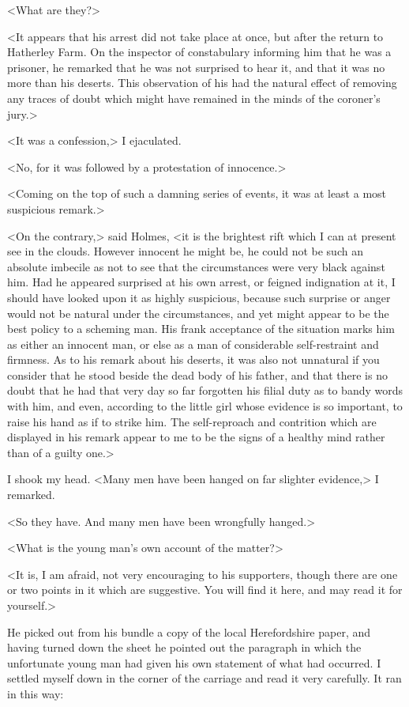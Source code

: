 <What are they?>

<It appears that his arrest did not take place at once, but after the return to Hatherley Farm. On the inspector of constabulary informing him that he was a prisoner, he remarked that he was not surprised to hear it, and that it was no more than his deserts. This observation of his had the natural effect of removing any traces of doubt which might have remained in the minds of the coroner's jury.>

<It was a confession,> I ejaculated.

<No, for it was followed by a protestation of innocence.>

<Coming on the top of such a damning series of events, it was at least a most suspicious remark.>

<On the contrary,> said Holmes, <it is the brightest rift which I can at present see in the clouds. However innocent he might be, he could not be such an absolute imbecile as not to see that the circumstances were very black against him. Had he appeared surprised at his own arrest, or feigned indignation at it, I should have looked upon it as highly suspicious, because such surprise or anger would not be natural under the circumstances, and yet might appear to be the best policy to a scheming man. His frank acceptance of the situation marks him as either an innocent man, or else as a man of considerable self-restraint and firmness. As to his remark about his deserts, it was also not unnatural if you consider that he stood beside the dead body of his father, and that there is no doubt that he had that very day so far forgotten his filial duty as to bandy words with him, and even, according to the little girl whose evidence is so important, to raise his hand as if to strike him. The self-reproach and contrition which are displayed in his remark appear to me to be the signs of a healthy mind rather than of a guilty one.>

I shook my head. <Many men have been hanged on far slighter evidence,> I remarked.

<So they have. And many men have been wrongfully hanged.>

<What is the young man's own account of the matter?>

<It is, I am afraid, not very encouraging to his supporters, though there are one or two points in it which are suggestive. You will find it here, and may read it for yourself.>

He picked out from his bundle a copy of the local Herefordshire paper, and having turned down the sheet he pointed out the paragraph in which the unfortunate young man had given his own statement of what had occurred. I settled myself down in the corner of the carriage and read it very carefully. It ran in this way:

